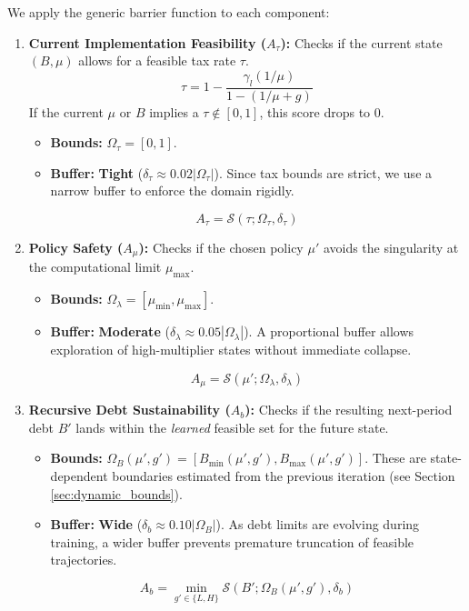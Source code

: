 We apply the generic barrier function to each component:

\begin{enumerate}
    \item \textbf{Current Implementation Feasibility ($A_{\tau}$):}
    Checks if the current state $(B, \mu)$ allows for a feasible tax rate $\tau$.
    \[ \tau = 1 - \frac{\gamma_l (1/\mu)}{1 - (1/\mu + g)} \]
    If the current $\mu$ or $B$ implies a $\tau \notin [0, 1]$, this score drops to 0.
    \begin{itemize}
        \item \textbf{Bounds:} $\Omega_{\tau} = [0, 1]$.
        \item \textbf{Buffer:} \textbf{Tight} ($\delta_{\tau} \approx 0.02 |\Omega_{\tau}|$). Since tax bounds are strict, we use a narrow buffer to enforce the domain rigidly.
    \end{itemize}
    \[ A_{\tau} = \mathcal{S}(\tau; \Omega_{\tau}, \delta_{\tau}) \]

    \item \textbf{Policy Safety ($A_{\mu}$):}
    Checks if the chosen policy $\mu'$ avoids the singularity at the computational limit $\mu_{\max}$.
    \begin{itemize}
        \item \textbf{Bounds:} $\Omega_{\lambda} = [\mu_{\min}, \mu_{\max}]$.
        \item \textbf{Buffer:} \textbf{Moderate} ($\delta_{\lambda} \approx 0.05 |\Omega_{\lambda}|$). A proportional buffer allows exploration of high-multiplier states without immediate collapse.
    \end{itemize}
    \[ A_{\mu} = \mathcal{S}(\mu'; \Omega_{\lambda}, \delta_{\lambda}) \]

    \item \textbf{Recursive Debt Sustainability ($A_{b}$):}
    Checks if the resulting next-period debt $B'$ lands within the \textit{learned} feasible set for the future state.
    \begin{itemize}
        \item \textbf{Bounds:} $\Omega_{B}(\mu', g') = [B_{\min}(\mu', g'), B_{\max}(\mu', g')]$. These are state-dependent boundaries estimated from the previous iteration (see Section \ref{sec:dynamic_bounds}).
        \item \textbf{Buffer:} \textbf{Wide} ($\delta_{b} \approx 0.10 |\Omega_{B}|$). As debt limits are evolving during training, a wider buffer prevents premature truncation of feasible trajectories.
    \end{itemize}
    \[ A_{b} = \min_{g' \in \{L, H\}} \mathcal{S}(B'; \Omega_{B}(\mu', g'), \delta_{b}) \]
\end{enumerate}

